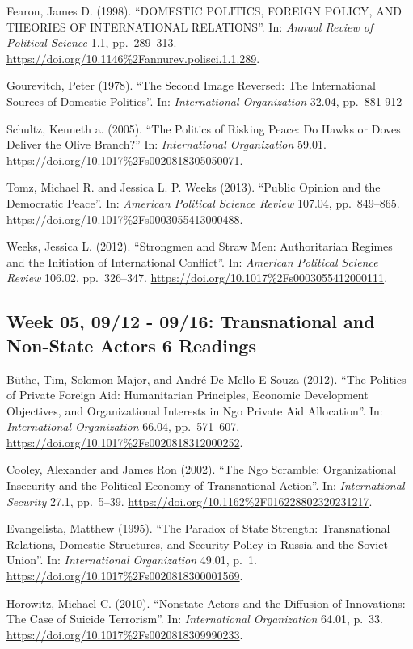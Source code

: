 \documentclass[10pt,]{article}
\begin{document}
Fearon, James D. (1998). ``DOMESTIC POLITICS, FOREIGN POLICY, AND
THEORIES OF INTERNATIONAL RELATIONS''. In:
\emph{Annual Review of Political Science} 1.1, pp.~289--313.
\url{https://doi.org/10.1146\%2Fannurev.polisci.1.1.289}.

Gourevitch, Peter (1978). ``The Second Image Reversed: The International
Sources of Domestic Politics''. In: \emph{International Organization}
32.04, pp.~881-912

Schultz, Kenneth a. (2005). ``The Politics of Risking Peace: Do Hawks or
Doves Deliver the Olive Branch?'' In: \emph{International Organization}
59.01. \url{https://doi.org/10.1017\%2Fs0020818305050071}.

Tomz, Michael R. and Jessica L. P. Weeks (2013). ``Public Opinion and
the Democratic Peace''. In: \emph{American Political Science Review}
107.04, pp.~849--865.
\url{https://doi.org/10.1017\%2Fs0003055413000488}.

Weeks, Jessica L. (2012). ``Strongmen and Straw Men: Authoritarian
Regimes and the Initiation of International Conflict''. In:
\emph{American Political Science Review} 106.02, pp.~326--347.
\url{https://doi.org/10.1017\%2Fs0003055412000111}.

\subsection{Week 05, 09/12 - 09/16: Transnational and Non-State Actors
\textbar{} 6
Readings}\label{week-05-0912---0916-transnational-and-non-state-actors-6-readings}

Büthe, Tim, Solomon Major, and André De Mello E Souza (2012). ``The
Politics of Private Foreign Aid: Humanitarian Principles, Economic
Development Objectives, and Organizational Interests in Ngo Private Aid
Allocation''. In: \emph{International Organization} 66.04, pp.~571--607.
\url{https://doi.org/10.1017\%2Fs0020818312000252}.

Cooley, Alexander and James Ron (2002). ``The Ngo Scramble:
Organizational Insecurity and the Political Economy of Transnational
Action''. In: \emph{International Security} 27.1, pp.~5--39.
\url{https://doi.org/10.1162\%2F016228802320231217}.

Evangelista, Matthew (1995). ``The Paradox of State Strength:
Transnational Relations, Domestic Structures, and Security Policy in
Russia and the Soviet Union''. In: \emph{International Organization}
49.01, p.~1. \url{https://doi.org/10.1017\%2Fs0020818300001569}.

Horowitz, Michael C. (2010). ``Nonstate Actors and the Diffusion of
Innovations: The Case of Suicide Terrorism''. In:
\emph{International Organization} 64.01, p.~33.
\url{https://doi.org/10.1017\%2Fs0020818309990233}.
\end{document}
